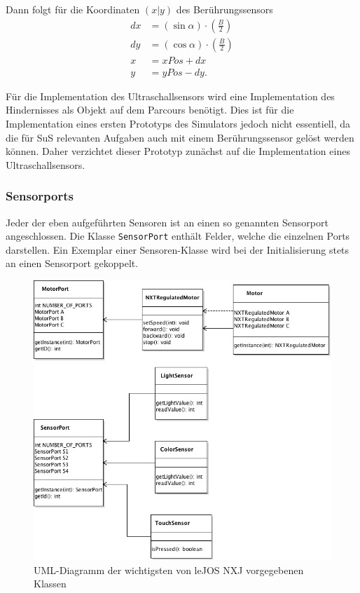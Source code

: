 \documentclass[paper=a4, DIV=calc, BCOR=12mm, twoside=on, onecolumn=on, open = right, titlepage =on, parskip =half-, headsepline = on, footsepline = off, chapterprefix = off, appendixprefix = on, fontsize = 12pt, numbers = noenddot, abstract = on]{scrbook}
\begin{document}
Dann folgt für die Koordinaten $\left( x \vert y \right)$ des Berührungssensors
\begin{align*}
dx & = \left( \sin \alpha \right) \cdot \left( \frac{B}{2} \right)\\
dy & = \left( \cos \alpha \right) \cdot \left( \frac{B}{2} \right)\\
 x & = xPos + dx\\
 y & = yPos - dy.
\end{align*}


Für die Implementation des Ultraschallsensors wird eine Implementation des Hindernisses als Objekt auf dem Parcours benötigt. Dies ist für die Implementation eines ersten Prototyps des Simulators jedoch nicht essentiell, da die für SuS relevanten Aufgaben auch mit einem Berührungssensor gelöst werden können. Daher verzichtet dieser Prototyp zunächst auf die Implementation eines Ultraschallsensors.

\subsubsection{Sensorports}
Jeder der eben aufgeführten Sensoren ist an einen so genannten Sensorport angeschlossen. Die Klasse \texttt{SensorPort} enthält Felder, welche die einzelnen Ports darstellen. Ein Exemplar einer Sensoren-Klasse wird bei der Initialisierung stets an einen Sensorport gekoppelt. 
\clearpage


\begin{figure}[H]
\centering
\includegraphics[scale=0.63]{images/uml_api_essenz.png}
\caption[UML-Diagramm der Klassen im \texttt{nxt}-Paket]{UML-Diagramm der wichtigsten von leJOS NXJ vorgegebenen Klassen}
\label{fig:api_uml}
\end{figure}
\end{document}
